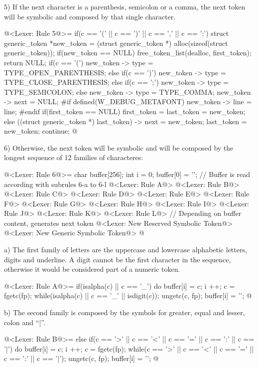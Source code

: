 5) If the next character is a parenthesis, semicolon or a comma, the
next token will be symbolic and composed by that single character.

\iniciocodigo
@<Lexer: Rule 5@>=
if(c == '(' || c == ')' || c == ',' || c == ';'){
  struct generic_token *new_token =
     (struct generic_token *) alloc(sizeof(struct generic_token));
  if(new_token == NULL){
    free_token_list(dealloc, first_token);
    return NULL;
  }
  if(c == '(')
    new_token -> type = TYPE_OPEN_PARENTHESIS;
  else if(c == ')')
    new_token -> type = TYPE_CLOSE_PARENTHESIS;
  else if(c == ';')
    new_token -> type = TYPE_SEMICOLON;
  else
    new_token -> type = TYPE_COMMA;
  new_token -> next = NULL;
#if defined(W_DEBUG_METAFONT)
  new_token -> line = line;
#endif
  if(first_token == NULL)
    first_token = last_token = new_token;
  else{
    ((struct generic_token *) last_token) -> next = new_token;
    last_token = new_token;
  }
  continue;
}
@
\fimcodigo

6) Otherwise, the next token will be symbolic and will be composed by
the longest sequence of 12 families of characteres:

\iniciocodigo
@<Lexer: Rule 6@>=
{
  char buffer[256];
  int i = 0;
  buffer[0] = '\0';
  // Buffer is read according with subrules 6-a to 6-l
  @<Lexer: Rule A@>
  @<Lexer: Rule B@>
  @<Lexer: Rule C@>
  @<Lexer: Rule D@>
  @<Lexer: Rule E@>
  @<Lexer: Rule F@>
  @<Lexer: Rule G@>
  @<Lexer: Rule H@>
  @<Lexer: Rule I@>
  @<Lexer: Rule J@>
  @<Lexer: Rule K@>
  @<Lexer: Rule L@>
  // Depending on buffer content, generates next token
  @<Lexer: New Reserved Symbolic Token@>
  @<Lexer: New Generic Symbolic Token@>
}
@
\fimcodigo

a) The first family of letters are the uppercase and lowercase
alphabetic letters, digits and underline. A digit cannot be the first
character in the sequence, otherwise it would be considered part of a
numeric token.

\iniciocodigo
@<Lexer: Rule A@>=
if(isalpha(c) || c == '_'){
  do{
    buffer[i] = c;
    i ++;
    c = fgetc(fp);
  } while(isalpha(c) || c == '_' || isdigit(c));
  ungetc(c, fp);
  buffer[i] = '\0';
}
@
\fimcodigo

b) The second family is composed by the symbols for greater, equal and
lesser, colon and ``|''.

\iniciocodigo
@<Lexer: Rule B@>=
else if(c == '>' || c == '<' || c == '=' || c == ':' || c == '|'){
  do{
    buffer[i] = c;
    i ++;
    c = fgetc(fp);
  } while(c == '>' || c == '<' || c == '=' || c == ':' || c == '|');
  ungetc(c, fp);
  buffer[i] = '\0';
}
@
\fimcodigo

